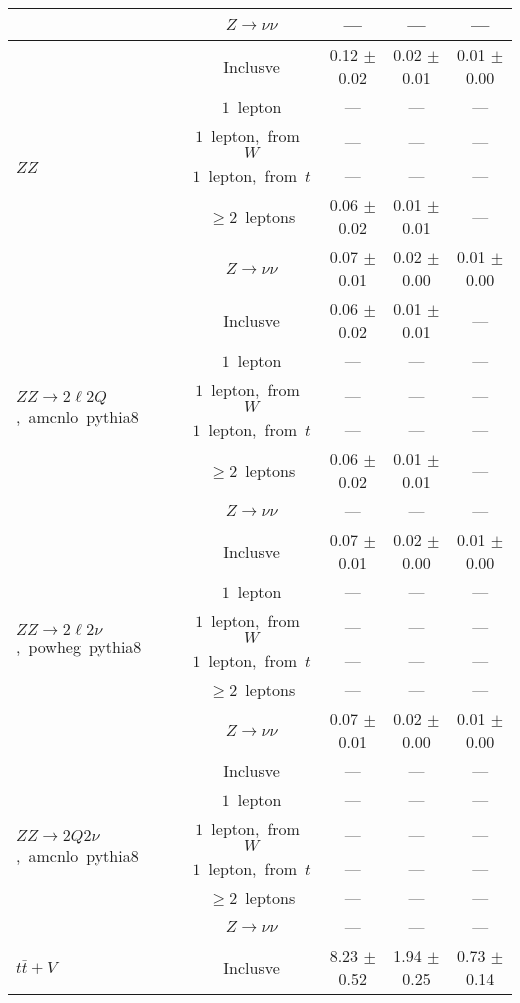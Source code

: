\documentclass{article}
\begin{document}
\begin{longtable}{|l|c|c|c|c|}
 & $Z\rightarrow\nu\nu$  & ---  & ---  & --- \\* 
\hline 
\multirow{6}{*}{$ZZ$} & Inclusve  & 0.12 $\pm$ 0.02  & 0.02 $\pm$ 0.01  & 0.01 $\pm$ 0.00 \\* 
 & $1$~lepton  & ---  & ---  & --- \\* 
 & $1$~lepton,~from~$W$  & ---  & ---  & --- \\* 
 & $1$~lepton,~from~$t$  & ---  & ---  & --- \\* 
 & $\ge2$~leptons  & 0.06 $\pm$ 0.02  & 0.01 $\pm$ 0.01  & --- \\* 
 & $Z\rightarrow\nu\nu$  & 0.07 $\pm$ 0.01  & 0.02 $\pm$ 0.00  & 0.01 $\pm$ 0.00 \\* 
\hline 
\multirow{6}{*}{$ZZ{\rightarrow}2{\ell}2Q$,~amcnlo~pythia8} & Inclusve  & 0.06 $\pm$ 0.02  & 0.01 $\pm$ 0.01  & --- \\* 
 & $1$~lepton  & ---  & ---  & --- \\* 
 & $1$~lepton,~from~$W$  & ---  & ---  & --- \\* 
 & $1$~lepton,~from~$t$  & ---  & ---  & --- \\* 
 & $\ge2$~leptons  & 0.06 $\pm$ 0.02  & 0.01 $\pm$ 0.01  & --- \\* 
 & $Z\rightarrow\nu\nu$  & ---  & ---  & --- \\* 
\hline 
\multirow{6}{*}{$ZZ{\rightarrow}2{\ell}2{\nu}$,~powheg~pythia8} & Inclusve  & 0.07 $\pm$ 0.01  & 0.02 $\pm$ 0.00  & 0.01 $\pm$ 0.00 \\* 
 & $1$~lepton  & ---  & ---  & --- \\* 
 & $1$~lepton,~from~$W$  & ---  & ---  & --- \\* 
 & $1$~lepton,~from~$t$  & ---  & ---  & --- \\* 
 & $\ge2$~leptons  & ---  & ---  & --- \\* 
 & $Z\rightarrow\nu\nu$  & 0.07 $\pm$ 0.01  & 0.02 $\pm$ 0.00  & 0.01 $\pm$ 0.00 \\* 
\hline 
\multirow{6}{*}{$ZZ{\rightarrow}2Q2{\nu}$,~amcnlo~pythia8} & Inclusve  & ---  & ---  & --- \\* 
 & $1$~lepton  & ---  & ---  & --- \\* 
 & $1$~lepton,~from~$W$  & ---  & ---  & --- \\* 
 & $1$~lepton,~from~$t$  & ---  & ---  & --- \\* 
 & $\ge2$~leptons  & ---  & ---  & --- \\* 
 & $Z\rightarrow\nu\nu$  & ---  & ---  & --- \\* 
\hline 
\multirow{6}{*}{$t\bar{t}+V$} & Inclusve  & 8.23 $\pm$ 0.52  & 1.94 $\pm$ 0.25  & 0.73 $\pm$ 0.14 \\* 

\end{longtable}
\end{document}
